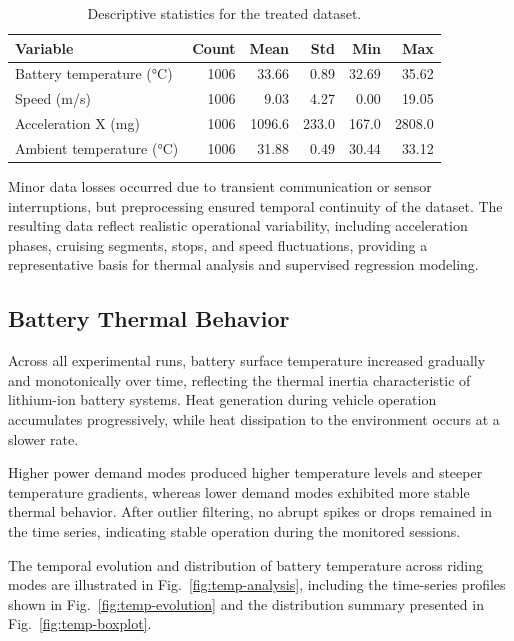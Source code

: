 \documentclass[runningheads]{llncs}
\begin{document}
\begin{table}[!ht]
\centering
\caption{Descriptive statistics for the treated dataset.}
\label{tab:desc-stats}
\scriptsize
\setlength{\tabcolsep}{4pt}
\begin{tabular}{lrrrrr}
\hline
Variable & Count & Mean & Std & Min & Max \\
\hline
Battery temperature (°C) & 1006 & 33.66 & 0.89 & 32.69 & 35.62 \\
Speed (m/s)              & 1006 & 9.03  & 4.27 & 0.00  & 19.05 \\
Acceleration X (mg)      & 1006 & 1096.6 & 233.0 & 167.0 & 2808.0 \\
Ambient temperature (°C) & 1006 & 31.88 & 0.49 & 30.44 & 33.12 \\
\hline
\end{tabular}
\end{table}

Minor data losses occurred due to transient communication or sensor interruptions, but preprocessing ensured temporal continuity of the dataset. The resulting data reflect realistic operational variability, including acceleration phases, cruising segments, stops, and speed fluctuations, providing a representative basis for thermal analysis and supervised regression modeling.


\subsection{Battery Thermal Behavior}

Across all experimental runs, battery surface temperature increased gradually and monotonically over time, reflecting the thermal inertia characteristic of lithium-ion battery systems. Heat generation during vehicle operation accumulates progressively, while heat dissipation to the environment occurs at a slower rate.

Higher power demand modes produced higher temperature levels and steeper temperature gradients, whereas lower demand modes exhibited more stable thermal behavior. After outlier filtering, no abrupt spikes or drops remained in the time series, indicating stable operation during the monitored sessions.

The temporal evolution and distribution of battery temperature across riding modes are illustrated in Fig.~\ref{fig:temp-analysis}, including the time-series profiles shown in Fig.~\ref{fig:temp-evolution} and the distribution summary presented in Fig.~\ref{fig:temp-boxplot}.
\end{document}
